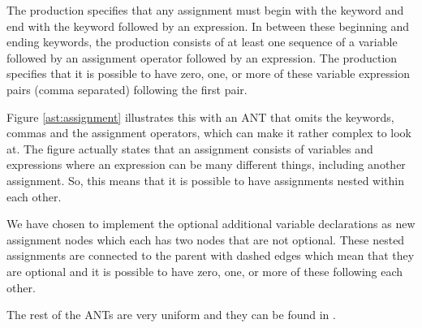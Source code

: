 The production specifies that any assignment must begin with the keyword
 and end with the keyword  followed by an expression. In
between these beginning and ending keywords, the production consists of at least
one sequence of a variable followed by an assignment operator followed by an
expression. The production specifies that it is possible to have zero, one, or
more of these variable expression pairs (comma separated) following the first
pair.



Figure \ref{ast:assignment} illustrates this with an ANT that omits the
keywords, commas and the assignment operators, which can make it rather complex
to look at. The figure actually states that an assignment consists of variables
and expressions where an expression can be many different things, including
another assignment. So, this means that it is possible to have assignments
nested within each other. 

We have chosen to implement the optional additional variable declarations as new assignment nodes
which each has two nodes that are not optional. These nested assignments are
connected to the parent with dashed edges which mean that they are optional and
it is possible to have zero, one, or more of these following each other.

The rest of the ANTs are very uniform and they can be found in .
